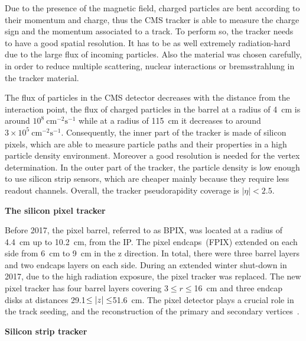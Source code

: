 Due to the presence of the magnetic field, charged particles are bent according to their momentum and charge, thus the CMS tracker is able to measure the charge sign and the momentum associated to a track. To perform so, the tracker needs to have a good spatial resolution. It has to be as well extremely radiation-hard due to the large flux of incoming particles. Also the material was chosen carefully, in order to reduce multiple scattering, nuclear interactions or bremsstrahlung in the tracker material.

The flux of particles in the CMS detector decreases with the distance from the interaction point, the flux of charged particles in the barrel at a radius of 4~cm is around $10^{8}~\mathrm{cm^{-2}s^{-1}}$ while at a radius of 115~cm it decreases to around $3 \times10^{5}~\mathrm{cm^{-2}s^{-1}}$. Consequently, the inner part of the tracker is made of silicon pixels, which are able to measure particle paths and their properties in a high particle density environment. Moreover a good resolution is needed for the vertex determination. In the outer part of the tracker, the particle density is low enough to use silicon strip sensors, which are cheaper mainly because they require less readout channels. Overall, the tracker pseudorapidity coverage is  $|\eta| < 2.5$.


\textbf{The silicon pixel tracker}

Before 2017, the pixel barrel, referred to as BPIX,  was located at a radius of 4.4~cm up to 10.2~cm, from the IP. The pixel endcaps~(FPIX) extended on each side from 6~cm to 9~cm in the z direction. In total, there were three barrel layers and two endcaps layers on each side. During an extended winter shut-down in 2017, due to the high radiation exposure, the pixel tracker was replaced. The new pixel tracker has four barrel layers covering 3$\leq r \leq$16~cm and three endcap disks at distances  29.1$\leq \abs{z} \leq$51.6~cm. The pixel detector plays a crucial role in the track seeding, and the reconstruction of the primary and secondary vertices~\cite{CMS:2012sda}. 



\textbf{Silicon strip tracker}


